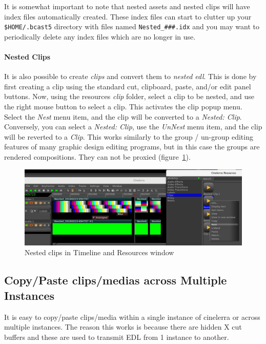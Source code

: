 It is somewhat important to note that nested assets and nested clips will have index files automatically created.  These index files can start to clutter up your \texttt{\$HOME/.bcast5} directory with files named \texttt{Nested\_\#\#\#.idx} and you may want to periodically delete any index files which are no longer in use.

\paragraph{Nested Clips} It is also possible to create \textit{clips} and convert them to \textit{nested edl}.  This is done by first creating a clip using the standard cut, clipboard, paste, and/or edit panel buttons.  Now, using the resources \textit{clip} folder, select a clip to be nested, and use the right mouse button to select a clip.  This activates the clip popup menu.  Select the \textit{Nest} menu item, and the clip will be converted to a \textit{Nested: Clip}. Conversely, you can select a \textit{Nested: Clip}, use the \textit{UnNest} menu item, and the clip will be reverted to a \textit{Clip}.  This works similarly to the group / un-group editing features of many graphic design editing programs, but in this case the groups are rendered compositions.  They can not be proxied (figure~\ref{fig:nesting}).
\begin{figure}[htpb]
    \centering
    \includegraphics[width=0.9\linewidth]{images/nesting.png}
    \caption{Nested clips in Timeline and Resources window}
    \label{fig:nesting}
\end{figure}

\subsection{Copy/Paste clips/medias across Multiple Instances}%
\label{sub:copy_paste_multiple_instances}

It is easy to copy/paste clips/media within a single instance of cinelerra or across multiple instances.  The reason this works is because there are hidden X cut buffers and these are used to transmit EDL from 1 instance to another.

